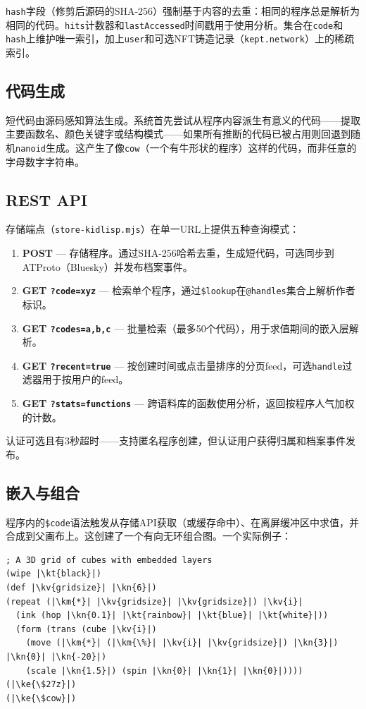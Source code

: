 \documentclass[10pt,letterpaper,twocolumn]{article}
\newcommand{\kn}[1]{\textcolor{klnum}{#1}}
\newcommand{\kt}[1]{\textcolor{klstr}{#1}}
\newcommand{\kv}[1]{\textcolor{klvar}{#1}}
\newcommand{\ke}[1]{\textcolor{klembed}{\textbf{#1}}}
\newcommand{\km}[1]{\textcolor{klmath}{#1}}
\begin{document}
\texttt{hash}字段（修剪后源码的SHA-256）强制基于内容的去重：相同的程序总是解析为相同的代码。\texttt{hits}计数器和\texttt{lastAccessed}时间戳用于使用分析。集合在\texttt{code}和\texttt{hash}上维护唯一索引，加上\texttt{user}和可选NFT铸造记录（\texttt{kept.network}）上的稀疏索引。

\subsection{代码生成}

短代码由源码感知算法生成。系统首先尝试从程序内容派生有意义的代码——提取主要函数名、颜色关键字或结构模式——如果所有推断的代码已被占用则回退到随机\texttt{nanoid}生成。这产生了像\texttt{cow}（一个有牛形状的程序）这样的代码，而非任意的字母数字字符串。

\subsection{REST API}

存储端点（\texttt{store-kidlisp.mjs}）在单一URL上提供五种查询模式：

\begin{enumerate}
  \item \textbf{POST} --- 存储程序。通过SHA-256哈希去重，生成短代码，可选同步到ATProto（Bluesky）并发布档案事件。
  \item \textbf{GET \texttt{?code=xyz}} --- 检索单个程序，通过\texttt{\$lookup}在\texttt{@handles}集合上解析作者标识。
  \item \textbf{GET \texttt{?codes=a,b,c}} --- 批量检索（最多50个代码），用于求值期间的嵌入层解析。
  \item \textbf{GET \texttt{?recent=true}} --- 按创建时间或点击量排序的分页feed，可选\texttt{handle}过滤器用于按用户的feed。
  \item \textbf{GET \texttt{?stats=functions}} --- 跨语料库的函数使用分析，返回按程序人气加权的计数。
\end{enumerate}

认证可选且有3秒超时——支持匿名程序创建，但认证用户获得归属和档案事件发布。

\subsection{嵌入与组合}

程序内的\texttt{\$code}语法触发从存储API获取（或缓存命中）、在离屏缓冲区中求值，并合成到父画布上。这创建了一个有向无环组合图。一个实际例子：

\begin{lstlisting}
; A 3D grid of cubes with embedded layers
(wipe |\kt{black}|)
(def |\kv{gridsize}| |\kn{6}|)
(repeat (|\km{*}| |\kv{gridsize}| |\kv{gridsize}|) |\kv{i}|
  (ink (hop |\kn{0.1}| |\kt{rainbow}| |\kt{blue}| |\kt{white}|))
  (form (trans (cube |\kv{i}|)
    (move (|\km{*}| (|\km{\%}| |\kv{i}| |\kv{gridsize}|) |\kn{3}|) |\kn{0}| |\kn{-20}|)
    (scale |\kn{1.5}|) (spin |\kn{0}| |\kn{1}| |\kn{0}|))))
(|\ke{\$27z}|)
(|\ke{\$cow}|)
\end{lstlisting}
\end{document}
